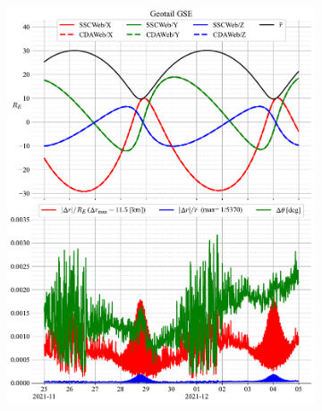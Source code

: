 \documentclass[draft]{agujournal2019}
\begin{document}
\begin{figure}[h]
\begin{subfigure}[b]{0.49\textwidth}
         \includegraphics[width=\textwidth]{figures/Geotail_GSE_SSCWeb_vs_CDAWeb.pdf}
     \end{subfigure}
     \begin{subfigure}[b]{0.49\textwidth}
         \centering

\end{subfigure}
\end{figure}
\end{document}
